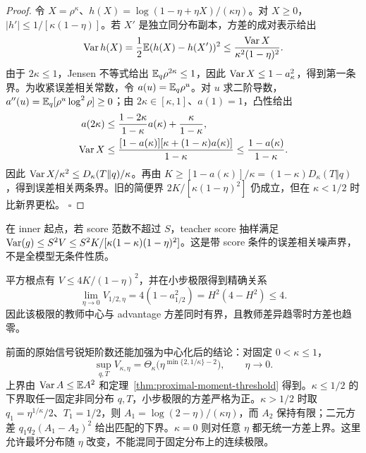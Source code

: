\begin{proof}
令 $X=\rho^\kappa$、$h(X)=\log(1-\eta+\eta X)/(\kappa\eta)$。对 $X\ge0$，$|h'|\le1/[\kappa(1-\eta)]$。若 $X'$ 是独立同分布副本，方差的成对表示给出
\begin{equation}
 \operatorname{Var} h(X)=\frac12\mathbb E(h(X)-h(X'))^2
 \le\frac{\operatorname{Var} X}{\kappa^2(1-\eta)^2}.
\end{equation}
由于 $2\kappa\le1$，Jensen 不等式给出 $\mathbb E_q\rho^{2\kappa}\le1$，因此 $\operatorname{Var} X\le1-a_\kappa^2$，得到第一条界。为收紧误差相关常数，令 $a(u)=\mathbb E_q\rho^u$。对 $u$ 求二阶导数，$a''(u)=\mathbb E_q[\rho^u\log^2\rho]\ge0$；由 $2\kappa\in[\kappa,1]$、$a(1)=1$，凸性给出
\begin{align}
 a(2\kappa)&\le\frac{1-2\kappa}{1-\kappa}a(\kappa)+\frac{\kappa}{1-\kappa},\\
 \operatorname{Var} X&\le\frac{[1-a(\kappa)][\kappa+(1-\kappa)a(\kappa)]}{1-\kappa}
 \le\frac{1-a(\kappa)}{1-\kappa}.
\end{align}
因此 $\operatorname{Var} X/\kappa^2\le D_\kappa(T\Vert q)/\kappa$。再由 $K\ge[1-a(\kappa)]/\kappa=(1-\kappa)D_\kappa(T\Vert q)$，得到误差相关两条界。旧的简便界 $2K/[\kappa(1-\eta)^2]$ 仍成立，但在 $\kappa<1/2$ 时比新界更松。
\hfill$\square$
\end{proof}

在 inner 起点，若 score 范数不超过 $S$，teacher score 抽样满足 $\operatorname{Var}(g)\le S^2V\le S^2K/[\kappa(1-\kappa)(1-\eta)^2]$。这是带 score 条件的误差相关噪声界，不是全模型无条件性质。

平方根点有 $V\le4K/(1-\eta)^2$，并在小步极限得到精确关系
\begin{equation}
 \lim_{\eta\to0}V_{1/2,\eta}
 =4(1-a_{1/2}^2)=H^2(4-H^2)\le4.
\end{equation}
因此该极限的教师中心与 advantage 方差同时有界，且教师差异趋零时方差也趋零。

前面的原始信号锐矩阶数还能加强为中心化后的结论：对固定 $0<\kappa\le1$，
\begin{equation}
 \sup_{q,T}V_{\kappa,\eta}
 =\Theta_\kappa\big(\eta^{\min\{2,1/\kappa\}-2}\big),\qquad\eta\to0.
\end{equation}
上界由 $\operatorname{Var} A\le\mathbb E A^2$ 和定理~\ref{thm:proximal-moment-threshold} 得到。$\kappa\le1/2$ 的下界取任一固定非同分布 $q,T$，小步极限的方差严格为正。$\kappa>1/2$ 时取 $q_1=\eta^{1/\kappa}/2$、$T_1=1/2$，则 $A_1=\log(2-\eta)/(\kappa\eta)$，而 $A_2$ 保持有限；二元方差 $q_1q_2(A_1-A_2)^2$ 给出匹配的下界。$\kappa=0$ 则对任意 $\eta$ 都无统一方差上界。这里允许最坏分布随 $\eta$ 改变，不能混同于固定分布上的连续极限。

